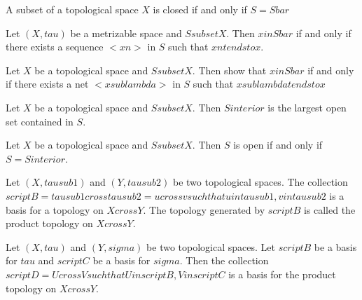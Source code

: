 \begin{prop}
    A subset of a topological space $X$ is closed if and only if $S = S bar$
\end{prop}

\begin{thm}
    Let $(X, tau)$ be a metrizable space and $S subset X$. Then $x in S bar$ if and only if there exists a sequence $<xn>$ in $S$ such that $xn tends to x$.
\end{thm}

\begin{thm}
    Let $X$ be a topological space and $S subset X$. Then show that $x in S bar$ if and only if there exists a net $< x sub lambda >$ in $S$ such that $ x sub lambda tends to x$
\end{thm}

\begin{thm}
    Let $X$ be a topological space and $S subset X$. Then $S interior$ is the largest open set contained in $S$.
\end{thm}

\begin{thm}
    Let $X$ be a topological space and $S subset X$. Then $S$ is open if and only if $S = S interior$.
\end{thm}

\begin{defn}
    Let $(X, tau sub 1)$ and $(Y, tau sub 2)$ be two topological spaces. The collection $script B = tau sub 1 cross tau sub 2 = {{ u cross v such that u in tau sub 1, v in tau sub 2 }}$ is a basis for a topology on $X cross Y$.
    The topology generated by $script B$ is called the product topology on $X cross Y$.
\end{defn}

\begin{thm}
    Let $(X, tau)$ and $(Y, sigma)$ be two topological spaces. Let $script B$ be a basis for $tau$ and $script C$ be a basis for $sigma$.
    Then the collection $script D = {{ U cross V such that U in script B, V in script C }}$ is a basis for the product topology on $X cross Y$.
\end{thm}
